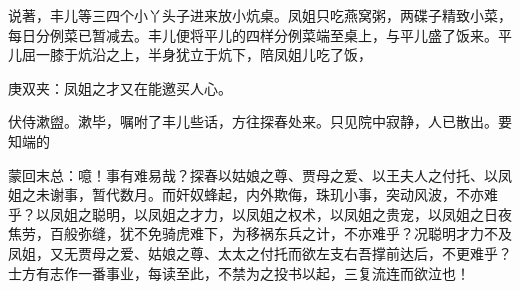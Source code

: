 \begin{parag}
    说著，丰儿等三四个小丫头子进来放小炕桌。凤姐只吃燕窝粥，两碟子精致小菜，每日分例菜已暂减去。丰儿便将平儿的四样分例菜端至桌上，与平儿盛了饭来。平儿屈一膝于炕沿之上，半身犹立于炕下，陪凤姐儿吃了饭，\begin{note}庚双夹：凤姐之才又在能邀买人心。\end{note}伏侍漱盥。漱毕，嘱咐了丰儿些话，方往探春处来。只见院中寂静，人已散出。要知端的
\end{parag}


\begin{parag}
    \begin{note}蒙回末总：噫！事有难易哉？探春以姑娘之尊、贾母之爱、以王夫人之付托、以凤姐之未谢事，暂代数月。而奸奴蜂起，内外欺侮，珠玑小事，突动风波，不亦难乎？以凤姐之聪明，以凤姐之才力，以凤姐之权术，以凤姐之贵宠，以凤姐之日夜焦劳，百般弥缝，犹不免骑虎难下，为移祸东兵之计，不亦难乎？况聪明才力不及凤姐，又无贾母之爱、姑娘之尊、太太之付托而欲左支右吾撑前达后，不更难乎？士方有志作一番事业，每读至此，不禁为之投书以起，三复流连而欲泣也！\end{note}
\end{parag}
